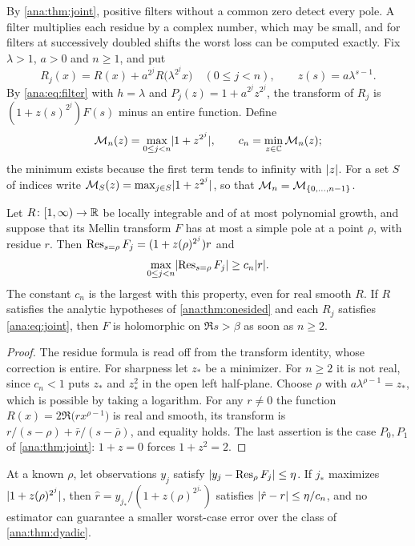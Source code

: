By \cref{ana:thm:joint}, positive filters without a common zero detect every pole. A filter
multiplies each residue by a complex number, which may be small, and for filters at
successively doubled shifts the worst loss can be computed exactly. Fix $\lambda>1$, $a>0$
and $n\ge1$, and put
\[
 R_j(x)=R(x)+a^{2^j}R\bigl(\lambda^{2^j}x\bigr)\quad(0\le j<n),\qquad z(s)=a\lambda^{s-1}.
\]
By \eqref{ana:eq:filter} with $h=\lambda$ and $P_j(z)=1+a^{2^j}z^{2^j}$, the transform of
$R_j$ is $(1+z(s)^{2^j})F(s)$ minus an entire function. Define
\[
 \mathcal{M}_n(z)=\max_{0\le j<n}\lvert1+z^{2^j}\rvert,\qquad c_n=\min_{z\in\mathbb{C}}\mathcal{M}_n(z);
\]
the minimum exists because the first term tends to infinity with $\lvert z\rvert$. For a set $S$ of
indices write $\mathcal{M}_S(z)=\max_{j\in S}\lvert1+z^{2^j}\rvert$, so that
$\mathcal{M}_n=\mathcal{M}_{\{0,\dots,n-1\}}$.

\begin{theorem}\label{ana:thm:dyadic}
Let $R\colon[1,\infty)\to\mathbb{R}$ be locally integrable and of at most polynomial growth, and
suppose that its Mellin transform $F$ has at most a simple pole at a point $\rho$, with
residue $r$. Then $\operatorname{Res}_{s=\rho}F_j=(1+z(\rho)^{2^j})r$ and
\[
 \max_{0\le j<n}\lvert\operatorname{Res}_{s=\rho}F_j\rvert\ge c_n\lvert r\rvert .
\]
The constant $c_n$ is the largest with this property, even for real smooth $R$. If $R$
satisfies the analytic hypotheses of \cref{ana:thm:onesided} and each $R_j$ satisfies
\eqref{ana:eq:joint}, then $F$ is holomorphic on $\Re s>\beta$ as soon as $n\ge2$.
\end{theorem}

\begin{proof}
The residue formula is read off from the transform identity, whose correction is entire. For
sharpness let $z_*$ be a minimizer. For $n\ge2$ it is not real, since $c_n<1$ puts $z_*$ and
$z_*^2$ in the open left half-plane. Choose $\rho$ with
$a\lambda^{\rho-1}=z_*$, which is possible by taking a logarithm. For any $r\ne0$ the
function $R(x)=2\Re\bigl(rx^{\rho-1}\bigr)$ is real and smooth, its transform is
$r/(s-\rho)+\bar r/(s-\bar\rho)$, and equality holds. The last assertion is the case
$P_0,P_1$ of \cref{ana:thm:joint}: $1+z=0$ forces $1+z^2=2$.
\end{proof}

\begin{corollary}\label{ana:cor:minimax}
At a known $\rho$, let observations $y_j$ satisfy $\lvert y_j-\operatorname{Res}_\rho F_j\rvert\le\eta$. If
$j_*$ maximizes $\lvert1+z(\rho)^{2^j}\rvert$, then $\hat r=y_{j_*}/(1+z(\rho)^{2^{j_*}})$ satisfies
$\lvert\hat r-r\rvert\le\eta/c_n$, and no estimator can guarantee a smaller worst-case error over
the class of \cref{ana:thm:dyadic}.
\end{corollary}

